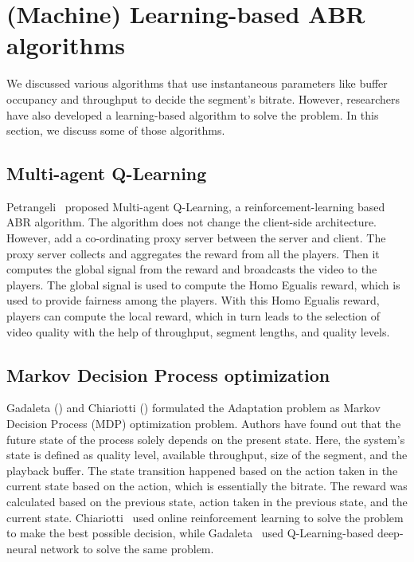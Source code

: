 \section{(Machine) Learning-based ABR algorithms}
We discussed various algorithms that use instantaneous parameters like buffer occupancy and throughput to decide the segment's bitrate. However, researchers have also developed a learning-based algorithm to solve the problem. In this section, we discuss some of those algorithms.

\subsection{Multi-agent Q-Learning}
Petrangeli \etal\ proposed Multi-agent Q-Learning\cite{6838245}, a reinforcement-learning based ABR algorithm. The algorithm does not change the client-side architecture. However, add a co-ordinating proxy server between the server and client. The proxy server collects and aggregates the reward from all the players. Then it computes the global signal from the reward and broadcasts the video to the players. The global signal is used to compute the Homo Egualis\cite{10.5555/1402298.1402344} reward, which is used to provide fairness among the players. With this Homo Egualis reward, players can compute the local reward, which in turn leads to the selection of video quality with the help of throughput, segment lengths, and quality levels.

\subsection{Markov Decision Process optimization}
Gadaleta \etal(\cite{8048013}) and Chiariotti \etal(\cite{10.1145/2910017.2910603}) formulated the Adaptation problem as Markov Decision Process (MDP)\cite{P-1066} optimization problem. Authors have found out that the future state of the process solely depends on the present state. Here, the system's state is defined as quality level, available throughput, size of the segment, and the playback buffer. The state transition happened based on the action taken in the current state based on the action, which is essentially the bitrate. The reward was calculated based on the previous state, action taken in the previous state, and the current state. Chiariotti \etal\ used online reinforcement learning to solve the problem to make the best possible decision, while Gadaleta \etal\ used Q-Learning-based deep-neural network to solve the same problem.

